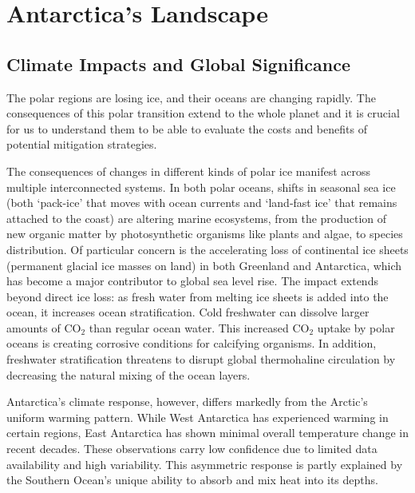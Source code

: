\chapter{Antarctica's Landscape}\label{why}
\section*{Climate Impacts and Global Significance}

The polar regions are losing ice, and their oceans are changing rapidly\cite{O_C_in_changingClimate}. The consequences of this polar transition extend to the whole planet and it is crucial for us to understand them to be able to evaluate the costs and benefits of potential mitigation strategies. 

The consequences of changes in different kinds of polar ice manifest across multiple interconnected systems. In both polar oceans, shifts in seasonal sea ice (both `pack-ice' that moves with ocean currents and `land-fast ice' that remains attached to the coast\cite{SeaIce}) are altering marine ecosystems, from the production of new organic matter by photosynthetic organisms like plants and algae, to species distribution\cite{O_C_in_changingClimate}. Of particular concern is the accelerating loss of continental ice sheets (permanent glacial ice masses on land) in both Greenland and Antarctica, which has become a major contributor to global sea level rise\cite{O_C_in_changingClimate}. The impact extends beyond direct ice loss: as fresh water from melting ice sheets is added into the ocean, it increases ocean stratification. Cold freshwater can dissolve larger amounts of $\mathrm{CO_2}$ than regular ocean water. This increased $\mathrm{CO_2}$ uptake by polar oceans is creating corrosive conditions for calcifying organisms\cite{O_C_in_changingClimate}. In addition, freshwater stratification threatens to disrupt global thermohaline circulation\cite{Jacobs_2004} by decreasing the natural mixing of the ocean layers.

Antarctica's climate response, however, differs markedly from the Arctic's uniform warming pattern. While West Antarctica has experienced warming in certain regions, East Antarctica has shown minimal overall temperature change in recent decades\cite{O_C_in_changingClimate}. These observations carry low confidence due to limited data availability and high variability\cite{O_C_in_changingClimate}. This asymmetric response is partly explained by the Southern Ocean's unique ability to absorb and mix heat into its depths\cite{L_T_C_C}.
 
